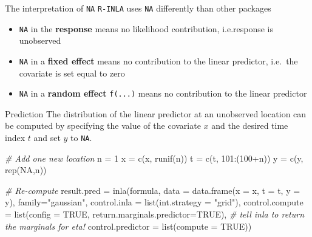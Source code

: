 \documentclass[
  ignorenonframetext,
]{beamer}
\newenvironment{Shaded}{\begin{snugshade}}{\end{snugshade}}
\newcommand{\AttributeTok}[1]{\textcolor[rgb]{0.77,0.63,0.00}{#1}}
\newcommand{\CommentTok}[1]{\textcolor[rgb]{0.56,0.35,0.01}{\textit{#1}}}
\newcommand{\ConstantTok}[1]{\textcolor[rgb]{0.00,0.00,0.00}{#1}}
\newcommand{\DecValTok}[1]{\textcolor[rgb]{0.00,0.00,0.81}{#1}}
\newcommand{\FunctionTok}[1]{\textcolor[rgb]{0.00,0.00,0.00}{#1}}
\newcommand{\NormalTok}[1]{#1}
\newcommand{\OtherTok}[1]{\textcolor[rgb]{0.56,0.35,0.01}{#1}}
\newcommand{\SpecialCharTok}[1]{\textcolor[rgb]{0.00,0.00,0.00}{#1}}
\newcommand{\StringTok}[1]{\textcolor[rgb]{0.31,0.60,0.02}{#1}}
\begin{document}
\begin{frame}[fragile]{The interpretation of \texttt{NA}}
\protect\hypertarget{the-interpretation-of-na}{}
\texttt{R-INLA} uses \texttt{NA} differently than other packages

\begin{itemize}
\item
  \texttt{NA} in the \textbf{response} means no likelihood contribution,
  i.e.response is unobserved
\item
  \texttt{NA} in a \textbf{fixed effect} means no contribution to the
  linear predictor, i.e.~the covariate is set equal to zero
\item
  \texttt{NA} in a \textbf{random effect} \texttt{f(...)} means no
  contribution to the linear predictor
\end{itemize}
\end{frame}

\begin{frame}[fragile]{Prediction}
\protect\hypertarget{prediction-1}{}
The distribution of the linear predictor at an unobserved location can
be computed by specifying the value of the covariate \(x\) and the
desired time index \(t\) and set \(y\) to \texttt{NA}. \small

\begin{Shaded}
\begin{Highlighting}[]
\CommentTok{\# Add one new location}
\NormalTok{n }\OtherTok{=} \DecValTok{1}
\NormalTok{x }\OtherTok{=} \FunctionTok{c}\NormalTok{(x, }\FunctionTok{runif}\NormalTok{(n))}
\NormalTok{t }\OtherTok{=} \FunctionTok{c}\NormalTok{(t, }\DecValTok{101}\SpecialCharTok{:}\NormalTok{(}\DecValTok{100}\SpecialCharTok{+}\NormalTok{n))}
\NormalTok{y }\OtherTok{=} \FunctionTok{c}\NormalTok{(y, }\FunctionTok{rep}\NormalTok{(}\ConstantTok{NA}\NormalTok{,n))}

\CommentTok{\# Re{-}compute}
\NormalTok{result.pred }\OtherTok{=} \FunctionTok{inla}\NormalTok{(formula,}
    \AttributeTok{data =} \FunctionTok{data.frame}\NormalTok{(}\AttributeTok{x =}\NormalTok{ x, }\AttributeTok{t =}\NormalTok{ t, }\AttributeTok{y =}\NormalTok{ y),}
    \AttributeTok{family=}\StringTok{"gaussian"}\NormalTok{,}
    \AttributeTok{control.inla =} \FunctionTok{list}\NormalTok{(}\AttributeTok{int.strategy =} \StringTok{"grid"}\NormalTok{),}
    \AttributeTok{control.compute =} \FunctionTok{list}\NormalTok{(}\AttributeTok{config =} \ConstantTok{TRUE}\NormalTok{, }
                           \AttributeTok{return.marginals.predictor=}\ConstantTok{TRUE}\NormalTok{), }
    \CommentTok{\# tell inla to return the marginals for eta!  }
    \AttributeTok{control.predictor =} \FunctionTok{list}\NormalTok{(}\AttributeTok{compute =} \ConstantTok{TRUE}\NormalTok{))}
\end{Highlighting}
\end{Shaded}

\normalsize
\end{frame}
\end{document}
